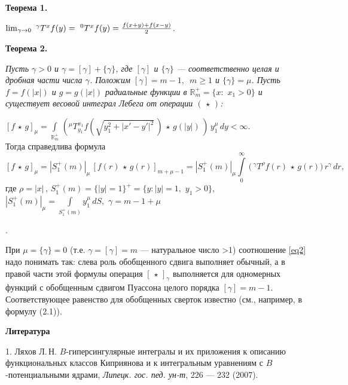 	{\bf Теорема 1.}  {\it $\lim_{\gamma\to0}\,\,^\gamma T^x f(y)=\,\,^0T^x f(y)={f(x+y)+f(x-y)\over2}$.

{\bf Теорема 2.}  {\it    Пусть $\gamma{>}0$ и $\gamma=[\gamma]+\{\gamma\}$, где $[\gamma]$ и $\{\gamma\}$ --- соответственно целая и дробная части числа $\gamma$.
Положим $[\gamma]=m-1, \,\,\,m\ge1$ и $\{\gamma\}=\mu$. Пусть $f=f(|x|)$ и
$g=g(|x|)$ радиальные функции в $\mathbb{R}^+_m=\{x:\,\,x_1>0\}$ и существует весовой интеграл Лебега от операции $(\,\star\,)$:

$
[f\,\star\,g]_\mu=\int\limits_{\mathbb{R}^+_m}\,\left(^\mu T^{x_1}_{y_1}f(\sqrt{y_1^2+
|x'-y'|^2}\,)\,\star\,g(|y|)\,\right)\,y_1^\mu\,dy<\infty.
$ \\
Тогда справедлива формула
\begin{equation}\label{eq2}
[f\,\star\,g]_\mu=|S_1^+(m)|_\mu\, \left[f(r)\,\star\,g(r)\right]_{m+\mu-1} =
|S^+_1(m)|_\mu\int\limits_0^\infty \,\biggl(\,^\gamma T^\rho f(r)\,\star\,g(r)
\biggl)\,r^\gamma\,dr,
\end{equation}
где  $\rho=|x|\,, \,S^+_1(m){=}\{|y|{=}1\}^+{=}\{y:|y|{=}1,\,\,y_1>0\}$,
$
|S_1^+(m)|_\mu{=}\int\limits_{S_1^+(m)} y_1^\mu\,dS,$  $\gamma{=}m{-}1{+}\mu$}}.

 При $\mu=\{\gamma\}=0$ (т.е. $\gamma=[\gamma]=m$ --- натуральное число >1) соотношение \eqref{eq2} надо понимать так:
 слева роль обобщенного сдвига выполняет обычный, а в правой части этой формулы операция $[\,\star\,]_\gamma$ выполняется для одномерных функций с обобщенным сдвигом Пуассона целого порядка $[\gamma]=m-1$. Соответствующее равенство для обобщенных сверток известно   (см., например,  в \cite{lit-ra3} формулу (2.1)).

\smallskip \centerline{\bf Литература}\nopagebreak

1. Ляхов Л.\,Н. $B$-гиперсингулярные интегралы и их приложения к описанию функциональных классов Киприянова и к интегральным уравнениям с $B$-потенциальными ядрами,  {\it Липецк. гос. пед. ун-т}, 226 --- 232 (2007).

